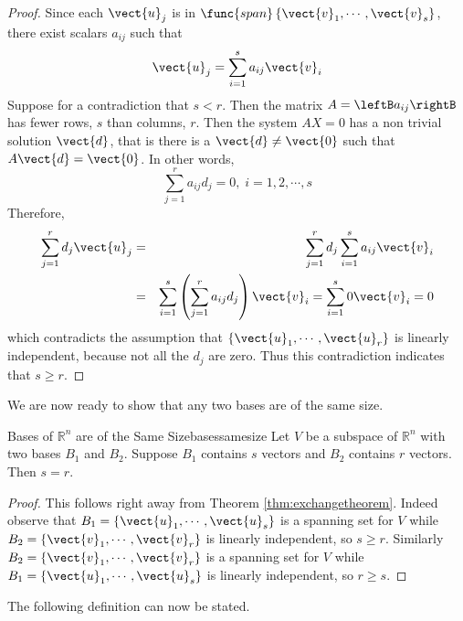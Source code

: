\begin{proof}
Since each $\vect{u}_j$ is in $\func{span}\left\{ \vect{v}_{1},\cdots ,\vect{v}_{s}\right\} 
$, there exist scalars $a_{ij}$ such that 
\begin{equation*}
\vect{u}_{j}=\sum_{i=1}^{s}a_{ij}\vect{v}_{i}
\end{equation*}
Suppose for a contradiction that $s<r$. Then the matrix $A = \leftB
a_{ij} \rightB$ has fewer rows, $s$ than columns, $r$. Then the system
$AX=0$ has %
a non trivial solution $\vect{d}$, that is there is a  $\vect{d}\neq \vect{0}$ such that  $A\vect{d}=\vect{0}$. In other
words, 
\begin{equation*}
\sum_{j=1}^{r}a_{ij}d_{j}=0,\;i=1,2,\cdots ,s
\end{equation*}
Therefore, 
\begin{eqnarray*}
\sum_{j=1}^{r}d_{j}\vect{u}_{j} &=&\sum_{j=1}^{r}d_{j}\sum_{i=1}^{s}a_{ij}
\vect{v}_{i} \\
&=&\sum_{i=1}^{s}\left( \sum_{j=1}^{r}a_{ij}d_{j}\right) \vect{v}
_{i}=\sum_{i=1}^{s}0\vect{v}_{i}=0
\end{eqnarray*}
which contradicts the assumption that $\left\{ \vect{u}_{1},\cdots ,\vect{u}_{r}\right\} $
is linearly independent, because not all the $d_{j}$ are zero. Thus this contradiction indicates that $s\geq r$. 
\end{proof}

We are now ready to show that any two bases are of the same size. 

\begin{theorem}{Bases of $\mathbb{R}^{n}$ are of the Same Size}{basessamesize}
Let $V$ be a subspace of $\mathbb{R}^{n}$ with two bases $B_1$ and $B_2$. Suppose $B_1$ contains $s$ vectors and $B_2$ contains $r$ vectors. Then $s=r.$
\end{theorem}

\begin{proof}
This follows right away from Theorem \ref{thm:exchangetheorem}. Indeed
observe that $B_1 = \left\{
\vect{u}_{1},\cdots ,\vect{u}_{s}\right\} $ is a spanning set for $V$ while $
B_2 = \left\{ \vect{v}_{1},\cdots ,\vect{v}_{r}\right\} $ is linearly
independent, so $s \geq r.$ Similarly $B_2 = \left\{ \vect{v}_{1},\cdots ,\vect{v}
_{r}\right\} $ is a spanning set for $V$ while $B_1 = \left\{ \vect{u}_{1},\cdots ,
\vect{u}_{s}\right\} $ is linearly independent,  so $r\geq s$.
\end{proof}

The following definition can now be stated.

